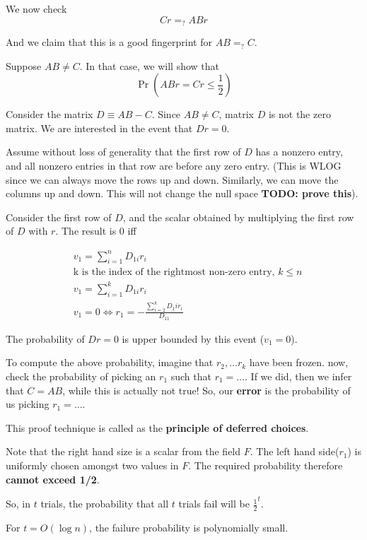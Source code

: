 We now check $$Cr =_? ABr$$

And we claim that this is a good fingerprint for $AB =_? C$.

Suppose $AB \neq C$. In that case, we will show that $$\Pr(ABr = Cr \leq \frac{1}{2})$$

Consider the matrix $D \equiv AB - C$. Since $AB \neq C$, matrix $D$ is not the zero
matrix. We are interested in the event that $Dr = 0$.

Assume without loss of generality that the first row of $D$ has a nonzero entry,
and all nonzero entries in that row are before any zero entry. (This is WLOG
since we can always move the rows up and down. Similarly, we can move the columns
up and down. This will not change the null space \textbf{TODO: prove this}).

Consider the first row of $D$, and the scalar obtained by multiplying the
first row of $D$ with $r$. The result is 0 iff

\begin{align*}
&v_1 = \sum_{i=1}^n D_{1i} {r_i} \\
&\text{k is the index of the rightmost non-zero entry, $k \leq n$} \\
&v_1 = \sum_{i=1}^k D_{1i} {r_i} \\
&v_1 = 0 \iff r_1 = - \frac{\sum_{i=2}^k D_1i r_i}{D_{11}}
\end{align*}

The probability of $Dr = 0$ is upper bounded by this event ($v_1 = 0$).

To compute the above probability, imagine that $r_2, \dots r_k$ have been frozen.
now, check the probability of picking an $r_1$ such that $r_1 = \dots$. If we
did, then we infer that $C = AB$, while this is actually not true! So, our
\textbf{error} is the probability of us picking $r_1 = \dots$.

This proof technique is called as the \textbf{principle of deferred choices}.

Note that the right hand size is a scalar from the field $F$. The left hand
side($r_1$) is uniformly chosen amongst two values in $F$. The required probability
therefore \textbf{cannot exceed 1/2}.

So, in $t$ trials, the probability that all $t$ trials fail will be
$\frac{1}{2}^t$.

For $t = O(\log n)$, the failure probability is polynomially small.
